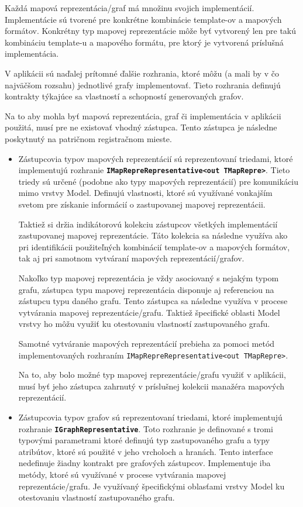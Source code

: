 Každá mapová reprezentácia/graf má množinu svojich implementácií. Implementácie sú tvorené pre konkrétne kombinácie template-ov a mapových formátov. Konkrétny typ mapovej reprezentácie môže byť vytvorený len pre takú kombináciu template-u a mapového formátu, pre ktorý je vytvorená príslušná implementácia.

V aplikácii sú naďalej prítomné ďalšie rozhrania, ktoré môžu (a mali by v čo najväčšom rozsahu) jednotlivé grafy implementovať. Tieto rozhrania definujú kontrakty týkajúce sa vlastností a schopností generovaných grafov.

\bigskip

Na to aby mohla byť mapová reprezentácia, graf či implementácia v aplikácii použitá, musí pre ne existovať vhodný zástupca. Tento zástupca je následne poskytnutý na patričnom registračnom mieste.
\begin{itemize}
    \item Zástupcovia typov mapových reprezentácií sú reprezentovaní triedami, ktoré implementujú rozhranie \textbf{\texttt{IMapRepreRepresentative<out TMapRepre>}}. Tieto triedy sú určené (podobne ako typy mapových reprezentácií) pre komunikáciu mimo vrstvy Model. Definujú vlastnosti, ktoré sú využívané vonkajším svetom pre získanie informácií o zastupovanej mapovej reprezentácii. 
    
    Taktiež si držia indikátorovú kolekciu zástupcov všetkých implementácií zastupovanej mapovej reprezentácie. Táto kolekcia sa následne využíva ako pri identifikácii použiteľných kombinácií template-ov a mapových formátov, tak aj pri samotnom vytváraní mapových reprezentácií/grafov.
    
    Nakoľko typ mapovej reprezentácia je vždy asociovaný s nejakým typom grafu, zástupca typu mapovej reprezentácia disponuje aj referenciou na zástupcu typu daného grafu. Tento zástupca sa následne využíva v procese vytvárania mapovej reprezentácie/grafu. Taktiež špecifické oblasti Model vrstvy ho môžu využiť ku otestovaniu vlastností zastupovaného grafu.

    Samotné vytváranie mapových reprezentácií prebieha za pomoci metód implementovaných rozhraním \texttt{IMapRepreRepresentative<out TMapRepre>}. 

    Na to, aby bolo možné typ mapovej reprezentácie/grafu využiť v aplikácii, musí byť jeho zástupca zahrnutý v príslušnej kolekcii manažéra mapových reprezentácií.

    \item Zástupcovia typov grafov sú reprezentovaní triedami, ktoré implementujú rozhranie \textbf{\texttt{IGraphRepresentative}}. Toto rozhranie je definované s tromi typovými parametrami ktoré definujú typ zastupovaného grafu  a typy atribútov, ktoré sú použité v jeho vrcholoch a hranách. Tento interface nedefinuje žiadny kontrakt pre grafových zástupcov. Implementuje iba metódy, ktoré sú využívané v procese vytvárania mapovej reprezentácie/grafu. Je využívaný špecifickými oblasťami vrstvy Model ku otestovaniu vlastností zastupovaného grafu.


\end{itemize}
